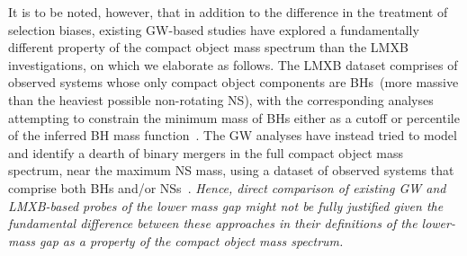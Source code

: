 \documentclass[modern]{aastex631}
\begin{document}
It is to be noted, however, that in addition to the difference in the treatment of selection biases, existing GW-based studies have explored a fundamentally different property of the compact object mass spectrum than the LMXB investigations, on which we elaborate as follows. The LMXB dataset comprises of observed systems whose only compact object components are BHs~(more massive than the heaviest possible non-rotating NS), with the corresponding analyses attempting to constrain the minimum mass of BHs either as a cutoff or percentile of the inferred BH mass function~\citep{Bailyn:1997xt, Ozel:2010su, Farr:2010tu}. The GW analyses have instead tried to model and identify a dearth of binary mergers in the full compact object mass spectrum, near the maximum NS mass, using a dataset of observed systems that comprise both BHs and/or NSs~\citep[i.e. including BNS systems,][]{Farah:2021qom, KAGRA:2021duu, LIGOScientific:2024elc}. \textit{Hence, direct comparison of existing GW and LMXB-based probes of the lower mass gap might not be fully justified given the fundamental difference between these approaches in their definitions of the lower-mass gap as a property of the compact object mass spectrum.} %
\end{document}
